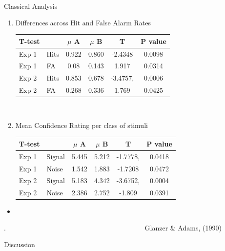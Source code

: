 \documentclass[final]{beamer}
\newlength{\onecolwid}
\begin{document}
\begin{frame}[t]
\begin{columns}[t]
\begin{column}{\onecolwid}
\begin{alertblock}{Classical Analysis}
\begin{enumerate}
$\qquad$


\item Differences across Hit and False Alarm Rates
\begin{table}
\vspace{3ex}
\begin{tabular}{l l | c c c c}
\toprule
\textbf{T-test} & \textbf{} & \textbf{$\mu$ A} & \textbf{$\mu$ B} & \textbf{T} & \textbf{P value}\\
\midrule
Exp 1 & Hits & 0.922 & 0.860 & -2.4348 & 0.0098 \\
Exp 1 & FA & 0.08 & 0.143 & 1.917 & 0.0314 \\
Exp 2 & Hits & 0.853 & 0.678 & -3.4757, & 0.0006 \\
Exp 2 & FA & 0.268 & 0.336 & 1.769 & 0.0425 \\
\bottomrule
\end{tabular}
\end{table}

$\quad$

\item Mean Confidence Rating per class of stimuli
\begin{table}
\vspace{3ex}
\begin{tabular}{l l |  c c c c}
\toprule
\textbf{T-test} & \textbf{} & \textbf{$\mu$ A} & \textbf{$\mu$ B} & \textbf{T} & \textbf{P value}\\
\midrule
Exp 1 & Signal & 5.445 & 5.212 & -1.7778, & 0.0418 \\
Exp 1 & Noise & 1.542 & 1.883 & -1.7208 & 0.0472 \\
Exp 2 & Signal & 5.183 & 4.342  & -3.6752, & 0.0004 \\
Exp 2 & Noise & 2.386 & 2.752 & -1.809 & 0.0391 \\
\bottomrule
\end{tabular}
\end{table}
\end{enumerate}
\begin{itemize}
\item
\end{itemize}
.$\qquad$$\qquad$$\qquad$$\qquad$$\qquad$$\qquad$$\qquad$$\qquad$$\qquad$$\qquad$ Glanzer \& Adams, (1990)
\end{alertblock}



\begin{alertblock}{Discussion}


\end{alertblock}
\end{column}
\end{columns}
\end{frame}
\end{document}

